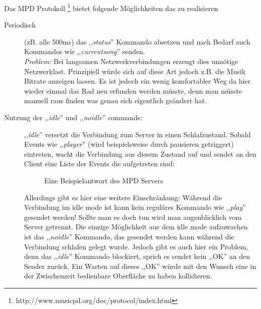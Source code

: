 Das MPD Protokoll \footnote{http://www.musicpd.org/doc/protocol/index.html} bietet folgende Möglichkeiten das zu realisieren
\begin{description}
    \item [Periodisch] (zB. alle 500ms) das ,,\textit{status}'' Kommando absetzen und nach Bedarf auch Kommandos wie ,,\textit{currentsong}''
        senden.
        \\
        \emph{Problem:} Bei langsamen Netzwerkverbindungen erzeugt dies unnötige Netzwerklast. 
        Prinzipiell würde sich auf diese Art jedoch z.B. die Musik Bitrate anzeigen lassen. Es ist jedoch ein
        wenig komfortabler Weg da hier wieder einmal das Rad neu erfunden werden müsste, denn man müsste manuell raus finden 
        was genau sich eigentlich geändert hat.
    \item [Nutzung der ,,\textit{idle}'' und ,,\textit{noidle}'' commands:]
        ,,\textit{idle}'' versetzt die Verbindung zum Server in einen Schlafzustand. Sobald Events wie ,,\textit{player}'' (wird beispielsweise durch pausieren getriggert) 
        eintreten, wacht die Verbindung aus diesem Zustand auf und sendet an den Client eine Liste der Events die aufgetreten sind:

	\begin{figure}[h!]
	  
	  \caption{Eine Beispielantwort des MPD Servers}
	  \label{dd_state}
	\end{figure}

        Allerdings gibt es hier eine weitere Einschränkung: Während die Verbindung im idle mode ist kann kein reguläres Kommando wie ,,\textit{play}'' gesendet werden!
        Sollte man es doch tun wird man augenblicklich vom Server getrennt.
        Die einzige Möglichkeit aus dem idle mode aufzuwachen ist das ,,\textit{noidle}'' Kommando, das gesendet werden
        kann während die Verbindung schlafen gelegt wurde.
        Jedoch gibt es auch hier ein Problem, denn das ,,\textit{idle}'' Kommando blockiert, sprich es sendet kein ,,OK'' an den  Sender zurück.
        Ein Warten auf dieses ,,OK'' würde mit den Wunsch eine in der Zwischenzeit bedienbare Oberfläche zu haben kollidieren.
\end{description}

